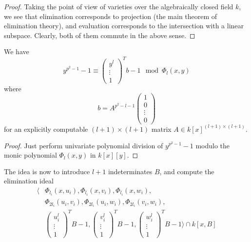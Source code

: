 \begin{proof}
    Taking the point of view of varieties over the algebraically closed field $k$, we see that elimination corresponds to projection (the main theorem of elimination theory), and evaluation corresponds to the intersection with a linear subspace.
    Clearly, both of them commute in the above sense.
\end{proof}
\begin{lemma}
    \label{prop:symbolic_elimination}
    We have
    \begin{equation*}
        y^{p^2 - 1} - 1 \equiv \left(\begin{matrix*}
            y^l \\
            \vdots \\
            1
        \end{matrix*}\right)^T b - 1 \mod \Phi_l(x, y)
    \end{equation*}
    where
    \begin{equation*}
        b = A^{p^2 - l - 1} \left(\begin{matrix*}
            1 \\
            0 \\
            \vdots \\
            0
        \end{matrix*}\right)
    \end{equation*}
    for an explicitly computable $(l + 1) \times (l + 1)$ matrix $A \in k[x]^{(l + 1) \times (l + 1)}$.
\end{lemma}
\begin{proof}
    Just perform univariate polynomial division of $y^{p^2 - 1} - 1$ modulo the monic polynomial $\Phi_l(x, y)$ in $k[x][y]$.
\end{proof}
The idea is now to introduce $l + 1$ indeterminates $B$, and compute the elimination ideal
\begin{align*}
    \langle &\Phi_{l_i}(x, u_i), \Phi_{l_i}(x, v_i), \Phi_{l_i}(x, w_i), \\
    &\Phi_{2l_i}(u_i, v_i), \Phi_{2l_i}(u_i, w_i), \Phi_{2l_i}(v_i, w_i), \\
    &\left(\begin{matrix*}
        u_i^l \\
        \vdots \\
        1
    \end{matrix*}\right)^T B - 1, \left(\begin{matrix*}
        v_i^l \\
        \vdots \\
        1
    \end{matrix*}\right)^T B - 1, \left(\begin{matrix*}
        w_i^l \\
        \vdots \\
        1
    \end{matrix*}\right)^T B - 1 \rangle \cap k[x, B]
\end{align*}
